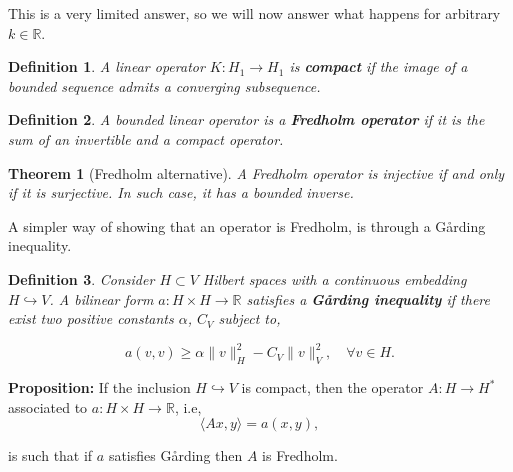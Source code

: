 \documentclass{article}
\newtheorem{definition}{Definition}
\newcommand{\R}{\mathbb{R}}
\newtheorem{theorem}{Theorem}
\begin{document}
This is a very limited answer, so we will now answer what happens for arbitrary $k\in\R$.

\begin{definition}
    A linear operator $K:H_1 \to H_1$ is \textbf{compact} if the image of a bounded sequence admits a converging subsequence.
\end{definition}
\begin{definition}
    A bounded linear operator is a \textbf{Fredholm operator} if it is the sum of an invertible and a compact operator. 
\end{definition}

\begin{theorem}[Fredholm alternative]
    A Fredholm operator is injective if and only if it is surjective. In such case, it has a bounded inverse.
\end{theorem}

A simpler way of showing that an operator is Fredholm, is through a Gårding inequality.

\begin{definition}
    Consider $H\subset V$ Hilbert spaces with a continuous embedding $H\hookrightarrow V$. 
    A bilinear form $a:H\times H\to \R$ satisfies a \textbf{Gårding inequality} if there exist two positive constants $\alpha$, $C_V$ subject to, 
    
    \[a(v,v) \geq \alpha \|v\|^2_H - C_V\|v\|^2_V,\quad \forall v\in H.\]
\end{definition}

\textbf{Proposition:}
 If the inclusion $H\hookrightarrow V$ is compact, then the operator $A: H\to H^*$ associated to $a:H\times H\to \R$, i.e,
 \[\langle Ax,y\rangle = a(x,y),\]

 is such that if $a$ satisfies Gårding then $A$ is Fredholm. 
\end{document}

